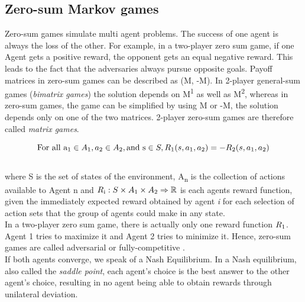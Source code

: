 \subsection{Zero-sum Markov games}
\label{zerosumgames}

Zero-sum games simulate multi agent problems. The success of one agent is always the loss of the other. For example, in a two-player zero sum game, if one Agent gets a positive reward, the opponent gets an equal negative reward. This leads to the fact that the adversaries always pursue opposite goals. Payoff matrices in zero-sum games can be described as (M, -M). 
In 2-player general-sum games (\textit{bimatrix games}) the solution depends on M\textsuperscript{1} as well as M\textsuperscript{2}, whereas in zero-sum games, the game can be simplified by using M or -M, the solution depends only on one of the two matrices. 2-player zero-sum games are therefore called \textit{matrix games}\cite{basics2hu1998multiagent}.

\[ 
\text{For all a\textsubscript{1}} \in A\textsubscript{1}, a \textsubscript{2} \in A\textsubscript{2}, \text{and s} \in S, R\textsubscript{1}(s, a\textsubscript{1}, a \textsubscript{2}) = - R\textsubscript{2}(s, a\textsubscript{1}, a \textsubscript{2})
\]
\\
where S is the set of states of the environment, A\textsubscript{n} is the collection of actions available to Agent n and $R\textsubscript{i}:S\times A\textsubscript{1}\times A\textsubscript{2} \Rightarrow \mathbb{R}$ is each agents reward function,  given the immediately expected reward obtained by agent \textit{i} for each selection of action sets that the group of agents could make in any state\cite{basics1littman1994markov}.\\
In a two-player zero sum game, there is actually only one reward function $R\textsubscript{1}$. Agent 1 tries to maximize it and Agent 2 tries to minimize it. Hence, zero-sum games are called adversarial or fully-competitive \cite{basics1littman1994markov}.\\
If both agents converge, we speak of a Nash Equilibrium.
In a Nash equilibrium, also called the \textit{saddle point}, each agent's choice is the best answer to the other agent's choice, resulting in no agent being able to obtain rewards through unilateral deviation\cite{nashgharesifard2013distributed, basics2hu1998multiagent}.


